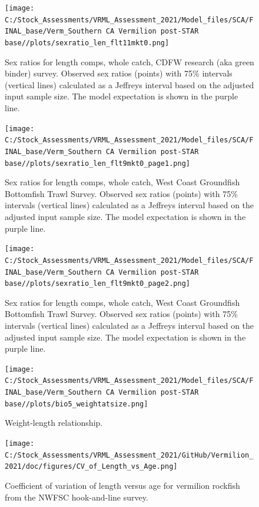 \documentclass[11pt,
  english,
]{article}
\begin{document}
\begin{figure}
\centering
\texttt{[image: C:/Stock\_Assessments/VRML\_Assessment\_2021/Model\_files/SCA/FINAL\_base/Verm\_Southern CA Vermilion post-STAR base//plots/sexratio\_len\_flt11mkt0.png]}
\caption{Sex ratios for length comps, whole catch, CDFW research (aka green binder) survey. Observed sex ratios (points) with 75\% intervals (vertical lines) calculated as a Jeffreys interval based on the adjusted input sample size. The model expectation is shown in the purple line.\label{fig:sexratio-CDFW-RESEARCH-1}}
\end{figure}

\begin{figure}
\centering
\texttt{[image: C:/Stock\_Assessments/VRML\_Assessment\_2021/Model\_files/SCA/FINAL\_base/Verm\_Southern CA Vermilion post-STAR base//plots/sexratio\_len\_flt9mkt0\_page1.png]}
\caption{Sex ratios for length comps, whole catch, West Coast Groundfish Bottomfish Trawl Survey. Observed sex ratios (points) with 75\% intervals (vertical lines) calculated as a Jeffreys interval based on the adjusted input sample size. The model expectation is shown in the purple line.\label{fig:sexratio-NWFSC-TWL-4}}
\end{figure}

\begin{figure}
\centering
\texttt{[image: C:/Stock\_Assessments/VRML\_Assessment\_2021/Model\_files/SCA/FINAL\_base/Verm\_Southern CA Vermilion post-STAR base//plots/sexratio\_len\_flt9mkt0\_page2.png]}
\caption{Sex ratios for length comps, whole catch, West Coast Groundfish Bottomfish Trawl Survey. Observed sex ratios (points) with 75\% intervals (vertical lines) calculated as a Jeffreys interval based on the adjusted input sample size. The model expectation is shown in the purple line.\label{fig:sexratio-NWFSC-TWL-5}}
\end{figure}

\FloatBarrier

\begin{figure}
\centering
\texttt{[image: C:/Stock\_Assessments/VRML\_Assessment\_2021/Model\_files/SCA/FINAL\_base/Verm\_Southern CA Vermilion post-STAR base//plots/bio5\_weightatsize.png]}
\caption{Weight-length relationship.\label{fig:weightlength}}
\end{figure}

\FloatBarrier

\begin{figure}
\centering
\texttt{[image: C:/Stock\_Assessments/VRML\_Assessment\_2021/GitHub/Vermilion\_2021/doc/figures/CV\_of\_Length\_vs\_Age.png]}
\caption{Coefficient of variation of length versus age for vermilion rockfish from the NWFSC hook-and-line survey.\label{fig:cv-length-age}}
\end{figure}
\end{document}
